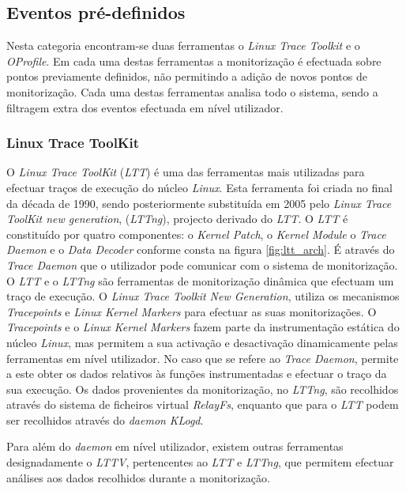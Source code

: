 \subsection{Eventos pré-definidos}

Nesta categoria encontram-se duas ferramentas o \textit{Linux Trace Toolkit} e o \textit{OProfile}.
Em cada uma destas ferramentas a monitorização é efectuada sobre pontos previamente definidos, não permitindo a adição de novos pontos de monitorização.
Cada uma destas ferramentas analisa todo o sistema, sendo a filtragem extra dos eventos efectuada em nível utilizador.

\subsubsection{Linux Trace ToolKit}\label{cap:linux_trace_toolkit_overview}

O \textit{Linux Trace ToolKit} (\textit{LTT}) é uma das ferramentas mais utilizadas para efectuar traços de execução do núcleo \textit{Linux}.
Esta ferramenta foi criada no final da década de 1990, sendo posteriormente substituída em 2005 pelo \textit{Linux Trace ToolKit new generation}, (\textit{LTTng}), projecto derivado do \textit{LTT}.
O \textit{LTT} é constituído por quatro componentes: o \textit{Kernel Patch}, o \textit{Kernel Module} o \textit{Trace Daemon} e o \textit{Data Decoder} conforme consta na figura \ref{fig:ltt_arch}.
É através do \textit{Trace Daemon} que o utilizador pode comunicar com o sistema de monitorização.
O \textit{LTT} e o \textit{LTTng} são ferramentas de monitorização dinâmica que efectuam um traço de execução.
O \textit{Linux Trace Toolkit New Generation}, utiliza os mecanismos \textit{Tracepoints}\cite{Mathieu2009} e \textit{Linux Kernel Markers}\cite{Mathieu2009} para efectuar as suas monitorizações.
O \textit{Tracepoints} e o \textit{Linux Kernel Markers} fazem parte da instrumentação estática do núcleo \textit{Linux}, mas permitem a sua activação e desactivação dinamicamente pelas ferramentas em nível utilizador.
No caso que se refere ao \textit{Trace Daemon}, permite a este obter os dados relativos às funções instrumentadas e efectuar o traço da sua execução.
Os dados provenientes da monitorização, no \textit{LTTng}, são recolhidos através do sistema de ficheiros virtual \textit{RelayFs}, enquanto que para o \textit{LTT} podem ser recolhidos através do \textit{daemon} \textit{KLogd}.

Para além do \textit{daemon} em nível utilizador, existem outras ferramentas designadamente o \textit{LTTV}, pertencentes ao \textit{LTT} e \textit{LTTng}, que permitem efectuar análises aos dados recolhidos durante a monitorização.

